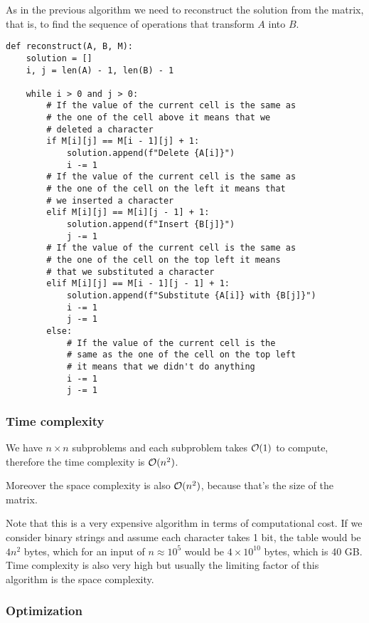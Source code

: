 \documentclass[14pt]{extarticle}
\begin{document}
As in the previous algorithm we need to reconstruct the solution from the matrix, that is, to find the sequence of operations that transform $A$ into $B$.

\begin{verbatim}
def reconstruct(A, B, M):
    solution = []
    i, j = len(A) - 1, len(B) - 1

    while i > 0 and j > 0:
        # If the value of the current cell is the same as 
        # the one of the cell above it means that we 
        # deleted a character
        if M[i][j] == M[i - 1][j] + 1:
            solution.append(f"Delete {A[i]}")
            i -= 1
        # If the value of the current cell is the same as 
        # the one of the cell on the left it means that
        # we inserted a character
        elif M[i][j] == M[i][j - 1] + 1:
            solution.append(f"Insert {B[j]}")
            j -= 1
        # If the value of the current cell is the same as
        # the one of the cell on the top left it means 
        # that we substituted a character
        elif M[i][j] == M[i - 1][j - 1] + 1:
            solution.append(f"Substitute {A[i]} with {B[j]}")
            i -= 1
            j -= 1
        else:
            # If the value of the current cell is the 
            # same as the one of the cell on the top left
            # it means that we didn't do anything
            i -= 1
            j -= 1
\end{verbatim}

\subsubsection{Time complexity}

We have $n \times n$ subproblems and each subproblem takes $\mathcal{O}(1)$ to compute, therefore the time complexity is $\mathcal{O}(n^2)$.

Moreover the space complexity is also $\mathcal{O}(n^2)$, because that's the size of the matrix.

Note that this is a very expensive algorithm in terms of computational cost. If we consider binary strings and assume each character takes 1 bit, the table would be $4 n^2 $ bytes, which for an input of $n \approx 10^5$ would be $4 \times 10^{10}$ bytes, which is 40 GB.
Time complexity is also very high but usually the limiting factor of this algorithm is the space complexity.

\subsubsection{Optimization}
\end{document}
